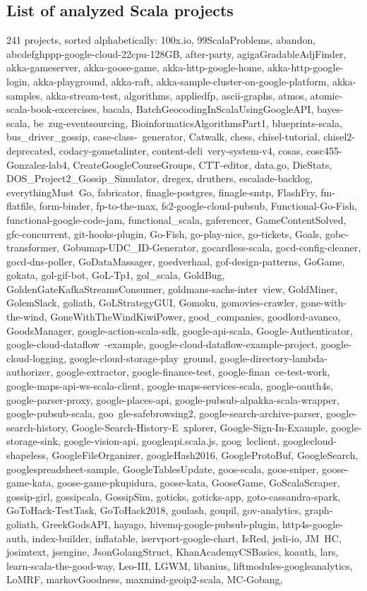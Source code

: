 \documentclass[onecolumn]{article}
\begin{document}
\subsection{List of analyzed Scala projects} \label{appendix_list_of_analyzed_projects}
241 projects, sorted alphabetically:
100x.io, 99ScalaProblems, abandon, abcdefghppp-google-cloud-22cpu-128GB, after-party, agigaGradableAdjFinder, akka-gameserver, akka-goose-game, akka-http-google-home, akka-http-google-login, akka-playground, akka-raft, akka-sample-cluster-on-google-platform, akka-samples, akka-stream-test, algorithms, appliedfp, ascii-graphs, atmos, atomic-scala-book-excercises, bacala, BatchGeocodingInScalaUsingGoogleAPI, bayes-scala, be\ zug-eventsourcing, BioinformaticsAlgorithmsPart1, blueprints-scala, bus\_driver\_gossip, case-class-\ generator, Catwalk, chess, chisel-tutorial, chisel2-deprecated, codacy-gometalinter, content-deli\ very-system-v4, cosas, cosc455-Gonzalez-lab4, CreateGoogleCourseGroups, CTT-editor, data.go, DieStats, DOS\_Project2\_Gossip\_Simulator, dregex, druthers, escalade-backlog, everythingMust\ Go, fabricator, finagle-postgres, finagle-smtp, FlashFry, fm-flatfile, form-binder, fp-to-the-max, fs2-google-cloud-pubsub, Functional-Go-Fish, functional-google-code-jam, functional\_scala, gaferencer, GameContentSolved, gfc-concurrent, git-hooks-plugin, Go-Fish, go-play-nice, go-tickets, Goals, gobc-transformer, Gobumap-UDC\_ID-Generator, gocardless-scala, gocd-config-cleaner, gocd-dns-poller, GoDataMassager, goedverhaal, gof-design-patterns, GoGame, gokata, gol-gif-bot, GoL-Tp1, gol\_scala, GoldBug, GoldenGateKafkaStreamsConsumer, goldmans-sachs-inter\ view, GoldMiner, GolemSlack, goliath, GoLStrategyGUI, Gomoku, gomovies-crawler, gone-with-the-wind, GoneWithTheWindKiwiPower, good\_companies, goodlord-avanco, GoodsManager, google-action-scala-sdk, google-api-scala, Google-Authenticator, google-cloud-dataflow\ -example, google-cloud-dataflow-example-project, google-cloud-logging, google-cloud-storage-play\ ground, google-directory-lambda-authorizer, google-extractor, google-finance-test, google-finan\ ce-test-work, google-maps-api-ws-scala-client, google-maps-services-scala, google-oauth4s, google-parser-proxy, google-places-api, google-pubsub-alpakka-scala-wrapper, google-pubsub-scala, goo\ gle-safebrowsing2, google-search-archive-parser, google-search-history, Google-Search-History-E\ xplorer, Google-Sign-In-Example, google-storage-sink, google-vision-api, googleapi.scala.js, goog\ leclient, googlecloud-shapeless, GoogleFileOrganizer, googleHash2016, GoogleProtoBuf, GoogleSearch, googlespreadsheet-sample, GoogleTablesUpdate, goos-scala, goos-sniper, goose-game-kata, goose-game-pkupidura, goose-kata, GooseGame, GoScalaScraper, gossip-girl, gossipcala, GossipSim, goticks, goticks-app, goto-cassandra-spark, GoToHack-TestTask, GoToHack2018, goulash, goupil, gov-analytics, graph-goliath, GreekGodsAPI, hayago, hivemq-google-pubsub-plugin, http4s-google-auth, index-builder, inflatable, iservport-google-chart, IsRed, jedi-io, JM\ HC, josimtext, jsengine, JsonGolangStruct, KhanAcademyCSBasics, koauth, lars, learn-scala-the-good-way, Leo-III, LGWM, libanius, liftmodules-googleanalytics, LoMRF, markovGoodness, maxmind-geoip2-scala, MC-Gobang, 
\end{document}
